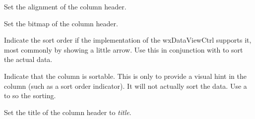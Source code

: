 Set the alignment of the column header.

\label{wxdataviewcolumnsetbitmap}


Set the bitmap of the column header.

\label{wxdataviewcolumnsetsortorder}


Indicate the sort order if the implementation of the
wxDataViewCtrl supports it, most commonly by showing
a little arrow. Use this in conjunction with 
to sort the actual data.

\label{wxdataviewcolumnsetsortable}


Indicate that the column is sortable. This is only to provide a
visual hint in the column (such as a sort order indicator). It
will not actually sort the data. Use a 
to so the sorting.

\label{wxdataviewcolumnsettitle}


Set the title of the column header to {\it title}.

